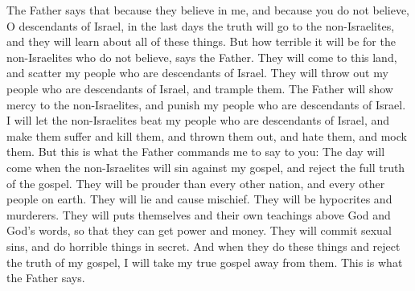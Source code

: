The Father says that because they believe in me, and because you do not believe, O descendants of Israel, in the last days the truth will go to the non-Israelites, and they will learn about all of these things.
\bverse \iffalse But wo, saith the Father, unto the unbelieving of the Gentiles--for notwithstanding they have come forth upon the face of this land, and have scattered my people who are of the house of Israel; and my people who are of the house of Israel have been cast out from among them, and have been trodden under feet by them; \fi
But how terrible it will be for the non-Israelites who do not believe, says the Father. They will come to this land, and scatter my people who are descendants of Israel. They will throw out my people who are descendants of Israel, and trample them.
\bverse \iffalse And because of the mercies of the Father unto the Gentiles, and also the judgments of the Father upon my people who are of the house of Israel, verily, verily, I say unto you, that after all this, and I have caused my people who are of the house of Israel to be smitten, and to be afflicted, and to be slain, and to be cast out from among them, and to become hated by them, and to become a hiss and a byword among them-- \fi
The Father will show mercy to the non-Israelites, and punish my people who are descendants of Israel. I will let the non-Israelites beat my people who are descendants of Israel, and make them suffer and kill them, and thrown them out, and hate them, and mock them.
\bverse \iffalse And thus commandeth the Father that I should say unto you: At that day when the Gentiles shall sin against my gospel, and shall reject the fulness of my gospel, and shall be lifted up in the pride of their hearts above all nations, and above all the people of the whole earth, and shall be filled with all manner of lyings, and of deceits, and of mischiefs, and all manner of hypocrisy, and murders, and priestcrafts, and whoredoms, and of secret abominations; and if they shall do all those things, and shall reject the fulness of my gospel, behold, saith the Father, I will bring the fulness of my gospel from among them. \fi
But this is what the Father commands me to say to you: The day will come when the non-Israelites will sin against my gospel, and reject the full truth of the gospel. They will be prouder than every other nation, and every other people on earth. They will lie and cause mischief. They will be hypocrites and murderers. They will puts themselves and their own teachings above God and God's words, so that they can get power and money. They will commit sexual sins, and do horrible things in secret. And when they do these things and reject the truth of my gospel, I will take my true gospel away from them. This is what the Father says.
